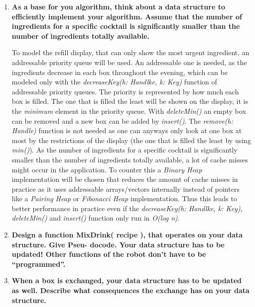 \begin{enumerate}
    \item \textbf{As a base for you algorithm, think about a data structure to efficiently implement your algorithm. Assume that the number of ingredients for a specific cocktail is significantly smaller than the number of ingredients totally available.}
    
    To model the refill display, that can only show the most urgent ingredient, an addressable priority queue will be used. An addressable one is needed, as the ingredients decrease in each box throughout the evening, which can be modeled only with the \textit{decreaseKey(h: Handlke, k: Key)} function of addressable priority queues. The priority is represented by how much each box is filled. The one that is filled the least will be shown on the display, it is the \textit{minimum} element in the priority queue. With \textit{deleteMin()} an empty box can be removed and a new box can be added by \textit{insert()}. The \textit{remove(h: Handle)} function is not needed as one can anyways only look at one box at most by the restrictions of the display (the one that is filled the least by using \textit{min()}). As the number of ingredients for a specific cocktail is significantly smaller than the number of ingredients totally available, a lot of cache misses might occur in the application. To counter this a \textit{Binary Heap} implementation will be chosen that reduces the amount of cache misses in practice as it uses addressable arrays/vectors internally instead of pointers like a \textit{Pairing Heap} or \textit{Fibonacci Heap} implementation. Thus this leads to better performance in practice even if the \textit{decreaseKey(h: Handlke, k: Key)}, \textit{deleteMin()} and \textit{insert()} function only run in \textit{O(log n)}.

	\item \textbf{Design a function MixDrink( recipe ), that operates on your data structure. Give Pseu- docode. Your data structure has to be updated! Other functions of the robot don’t have to be “programmed”.}

	\item \textbf{When a box is exchanged, your data structure has to be updated as well. Describe what consequences the exchange has on your data structure.}

\end{enumerate}
